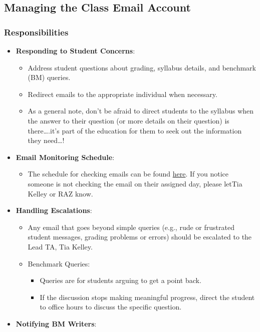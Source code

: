 \documentclass[
]{article}
\providecommand{\tightlist}{%
  \setlength{\itemsep}{0pt}\setlength{\parskip}{0pt}}
\begin{document}
\hypertarget{managing-the-class-email-account}{%
\subsection{Managing the Class Email Account}\label{managing-the-class-email-account}}

\hypertarget{responsibilities}{%
\subsubsection{Responsibilities}\label{responsibilities}}

\begin{itemize}
\tightlist
\item
  \textbf{Responding to Student Concerns}:

  \begin{itemize}
  \tightlist
  \item
    Address student questions about grading, syllabus details, and benchmark (BM) queries.
  \item
    Redirect emails to the appropriate individual when necessary.
  \item
    As a general note, don't be afraid to direct students to the syllabus when the answer to their question (or more details on their question) is there\ldots.it's part of the education for them to seek out the information they need\ldots!
  \end{itemize}
\item
  \textbf{Email Monitoring Schedule}:

  \begin{itemize}
  \tightlist
  \item
    The schedule for checking emails can be found \href{https://docs.google.com/spreadsheets/d/1AXT7fqusvnTBZrsaOuhRgZOQ4EmFNt0YmXQNxuAznls/edit?usp=sharing}{here}. If you notice someone is not checking the email on their assigned day, please letTia Kelley or RAZ know.
  \end{itemize}
\item
  \textbf{Handling Escalations}:

  \begin{itemize}
  \tightlist
  \item
    Any email that goes beyond simple queries (e.g., rude or frustrated student messages, grading problems or errors) should be escalated to the Lead TA, Tia Kelley.
  \item
    Benchmark Queries:

    \begin{itemize}
    \tightlist
    \item
      Queries are for students arguing to get a point back.
    \item
      If the discussion stops making meaningful progress, direct the student to office hours to discuss the specific question.
    \end{itemize}
  \end{itemize}
\item
  \textbf{Notifying BM Writers}:


\end{itemize}
\end{document}
